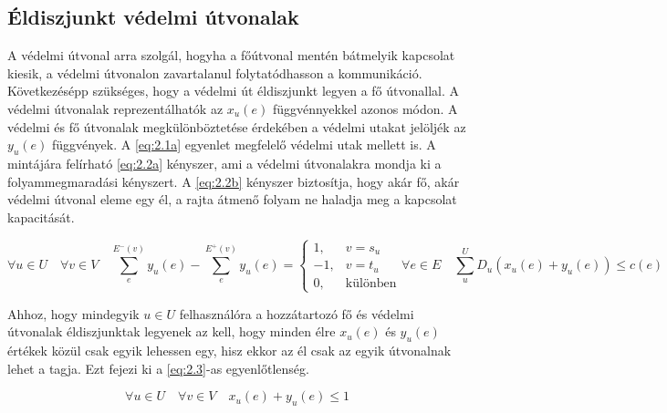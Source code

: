 \documentclass[a4paper,oneside]{article}
\newcommand{\inedge}[1]{E^-(#1)}
\newcommand{\outedge}[1]{E^+(#1)}
\begin{document}
\subsection{Éldiszjunkt védelmi útvonalak}
\label{sec:edgedisjunct}

A védelmi útvonal arra szolgál, hogyha a főútvonal mentén bátmelyik kapcsolat kiesik,
a védelmi útvonalon zavartalanul folytatódhasson a kommunikáció.
Következésépp szükséges, hogy a védelmi út éldiszjunkt legyen a fő útvonallal.
A védelmi útvonalak reprezentálhatók az $x_u(e)$ függvénnyekkel azonos módon.
A védelmi és fő útvonalak megkülönböztetése érdekében a védelmi utakat jelöljék az $y_u(e)$ függvények.
A \eqref{eq:2.1a} egyenlet megfelelő védelmi utak mellett is.
A mintájára felírható \eqref{eq:2.2a} kényszer,
ami a védelmi útvonalakra mondja ki a folyammegmaradási kényszert.
A \eqref{eq:2.2b} kényszer biztosítja, hogy akár fő, akár védelmi útvonal eleme egy él,
a rajta átmenő folyam ne haladja meg a kapcsolat kapacitását.

\begin{subequations}
  \begin{equation}
    \forall u \in U \quad \forall v \in V \quad \sum_{e}^{\inedge{v}}y_u(e) - \sum_{e}^{\outedge{v}}y_u(e) = \begin{cases}
      1, & v = s_u \\
      -1, & v = t_u\\
      0, & \text{különben}
    \end{cases} \label{eq:2.2a}
  \end{equation}
  \begin{equation}
    \forall e \in E \quad \sum_{u}^{U} D_u \left( x_u(e) + y_u(e) \right) \leq c(e) \label{eq:2.2b}
  \end{equation}
\end{subequations}

\newpage

Ahhoz, hogy mindegyik $u \in U$ felhasználóra a hozzátartozó fő és védelmi útvonalak éldiszjunktak legyenek az kell,
hogy minden élre $x_u(e)$ és $y_u(e)$ értékek közül csak egyik lehessen egy,
hisz ekkor az él csak az egyik útvonalnak lehet a tagja. Ezt fejezi ki a \eqref{eq:2.3}-as egyenlőtlenség.

\begin{equation}
  \forall u \in U \quad \forall v \in V \quad x_u(e) + y_u(e) \leq 1 \label{eq:2.3}
\end{equation}
\end{document}
